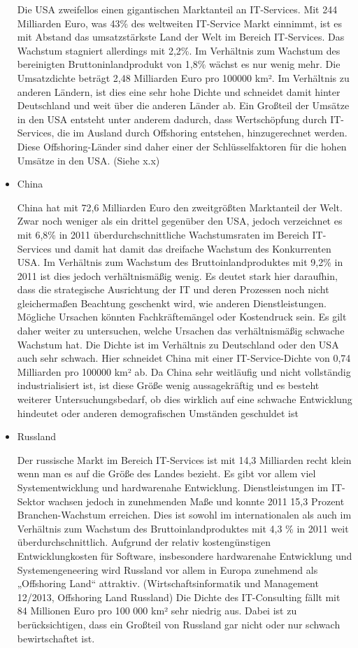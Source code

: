 \begin{itemize}
Die USA zweifellos einen gigantischen Marktanteil an IT-Services. Mit 244 Milliarden Euro, was 43\% des weltweiten IT-Service Markt einnimmt, ist es mit Abstand das umsatzstärkste Land der Welt im Bereich IT-Services. \cite{ibisUSA} Das Wachstum stagniert allerdings mit 2,2\%. Im Verhältnis zum Wachstum des bereinigten Bruttoninlandprodukt von 1,8\% wächst es nur wenig mehr. \cite{statUSA} Die Umsatzdichte beträgt 2,48 Milliarden Euro pro 100000 km². Im Verhältnis zu anderen Ländern, ist dies eine sehr hohe Dichte und schneidet damit hinter Deutschland und weit über die anderen Länder ab.
Ein Großteil der Umsätze in den USA entsteht unter anderem dadurch, dass Wertschöpfung durch IT-Services, die im Ausland durch Offshoring entstehen, hinzugerechnet werden. Diese Offshoring-Länder sind daher einer der Schlüsselfaktoren für die hohen Umsätze in den USA. (Siehe x.x)

\item {China}

China hat mit 72,6 Milliarden Euro den zweitgrößten Marktanteil der Welt. Zwar noch weniger als ein drittel gegenüber den USA, jedoch verzeichnet es mit 6,8\% in 2011 überdurchschnittliche Wachstumsraten im Bereich IT-Services und damit hat damit das dreifache Wachstum des Konkurrenten USA.  Im Verhältnis zum  Wachstum des Bruttoinlandproduktes mit 9,2\% in 2011 ist dies jedoch verhältnismäßig wenig. Es deutet stark hier daraufhin, dass die strategische Ausrichtung der IT und deren Prozessen noch nicht  gleichermaßen Beachtung geschenkt wird, wie anderen Dienstleistungen. Mögliche Ursachen könnten Fachkräftemängel oder Kostendruck sein. Es gilt daher weiter zu untersuchen, welche Ursachen das verhältnismäßig schwache Wachstum hat. Die Dichte ist im Verhältnis zu Deutschland oder den USA auch sehr schwach. Hier schneidet China mit einer IT-Service-Dichte von 0,74 Milliarden pro 100000 km² ab. Da China sehr weitläufig und nicht vollständig industrialisiert ist, ist diese Größe wenig aussagekräftig und es besteht weiterer Untersuchungsbedarf, ob dies wirklich auf eine schwache Entwicklung hindeutet oder anderen demografischen Umständen geschuldet ist \cite{ibisChina}

\item {Russland}

Der russische Markt im Bereich IT-Services ist mit 14,3 Milliarden recht klein wenn man es auf die Größe des Landes bezieht. Es gibt vor allem viel Systementwicklung und hardwarenahe Entwicklung. Dienstleistungen im IT-Sektor wachsen jedoch in zunehmenden Maße und konnte 2011 15,3 Prozent Branchen-Wachstum erreichen. Dies ist sowohl im internationalen als auch im Verhältnis zum Wachstum des Bruttoinlandproduktes mit 4,3 \% in 2011 weit überdurchschnittlich. \cite{statRus2} Aufgrund der relativ kostengünstigen Entwicklungkosten für Software, insbesondere hardwarenahe Entwicklung und Systemengeneering wird Russland vor allem in Europa  zunehmend als „Offshoring Land“ attraktiv. (Wirtschaftsinformatik und Management 12/2013, Offshoring Land Russland)
Die Dichte des IT-Consulting fällt mit 84 Millionen Euro pro 100 000 km² sehr niedrig aus. Dabei ist zu berücksichtigen, dass ein Großteil von Russland gar nicht oder nur schwach bewirtschaftet ist. \cite{statRus}



\end{itemize}
